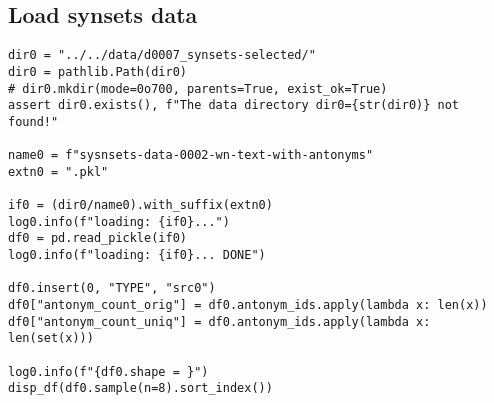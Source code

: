\documentclass[a4paper,10pt,onecolumn,oneside,openright]{article}
\begin{document}
\subsection{Load synsets data}
\label{sec:org365260f}
\begin{verbatim}
dir0 = "../../data/d0007_synsets-selected/"
dir0 = pathlib.Path(dir0)
# dir0.mkdir(mode=0o700, parents=True, exist_ok=True)
assert dir0.exists(), f"The data directory dir0={str(dir0)} not found!"

name0 = f"sysnsets-data-0002-wn-text-with-antonyms"
extn0 = ".pkl"

if0 = (dir0/name0).with_suffix(extn0)
log0.info(f"loading: {if0}...")
df0 = pd.read_pickle(if0)
log0.info(f"loading: {if0}... DONE")

df0.insert(0, "TYPE", "src0")
df0["antonym_count_orig"] = df0.antonym_ids.apply(lambda x: len(x))
df0["antonym_count_uniq"] = df0.antonym_ids.apply(lambda x: len(set(x)))

log0.info(f"{df0.shape = }")
disp_df(df0.sample(n=8).sort_index())
\end{verbatim}
\end{document}
